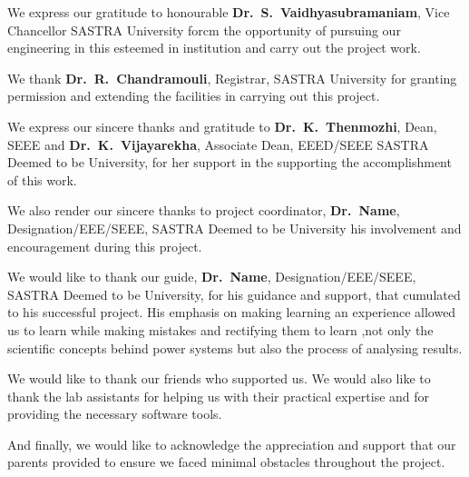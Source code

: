 \documentclass[a4paper, 12pt, oneside]{sastra}
\begin{document}
	
	
	
	\acknowledgements
	
	\hspace*{12pt} We express our gratitude to honourable \textbf{Dr.~S.~Vaidhyasubramaniam}, Vice Chancellor SASTRA University forcm the opportunity of pursuing our engineering in this esteemed in institution and carry out the project work.
	
	\par We thank \textbf{Dr.~R.~Chandramouli}, Registrar, SASTRA University for granting permission and extending the facilities in carrying out this project.
	
	\par We express our sincere thanks and gratitude to \textbf{Dr.~K.~Thenmozhi}, Dean, SEEE and \textbf{Dr.~K.~Vijayarekha}, Associate Dean, EEED/SEEE SASTRA Deemed to be University, for her support in the supporting the accomplishment of this work.
	
	\par We also render our sincere thanks to project coordinator, \textbf{Dr.~Name}, Designation/EEE/SEEE, SASTRA Deemed to be University his involvement and encouragement during this project.
	
	\par We would like to thank our guide, \textbf{Dr.~Name}, Designation/EEE/SEEE, SASTRA Deemed to be University, for his guidance and support, that cumulated to his successful project. His emphasis on making learning an experience allowed us to learn while making mistakes and rectifying them to learn ,not only the scientific concepts behind power systems but also the process of analysing results.
	
	\par We would like to thank our friends who supported us. We would also like to thank the lab assistants for helping us with their practical expertise and for providing the necessary software tools.
	
	\par And finally, we would like to acknowledge the appreciation and support that our parents provided to ensure we faced minimal obstacles throughout the project.
	\pagebreak
	
	\abstract
	
\end{document}
